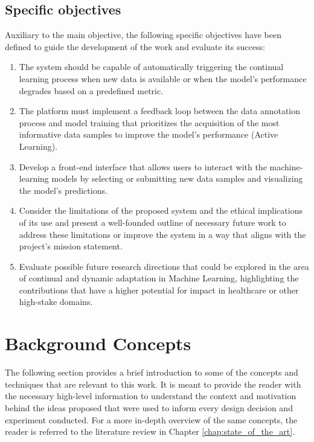 \documentclass[../main.tex]{subfiles}
\begin{document}
    \subsection*{Specific objectives} \label{sec:specific_objectives}

    Auxiliary to the main objective, the following specific objectives have been defined to guide the development of the work and evaluate its success:

    \begin{enumerate}
        \item The system should be capable of automatically triggering the continual learning process when new data is available or when the model's performance degrades based on a predefined metric.
        \item The platform must implement a feedback loop between the data annotation process and model training that prioritizes the acquisition of the most informative data samples to improve the model's performance (Active Learning).
        \item Develop a front-end interface that allows users to interact with the machine-learning models by selecting or submitting new data samples and visualizing the model's predictions.
        \item Consider the limitations of the proposed system and the ethical implications of its use and present a well-founded outline of necessary future work to address these limitations or improve the system in a way that aligns with the project's mission statement.
        \item Evaluate possible future research directions that could be explored in the area of continual and dynamic adaptation in Machine Learning, highlighting the contributions that have a higher potential for impact in healthcare or other high-stake domains.
    \end{enumerate}

    \clearpage

    \section{Background Concepts} \label{sec:background}
    
    The following section provides a brief introduction to some of the concepts and techniques that are relevant to this work. It is meant to provide the reader with the necessary high-level information to understand the context and motivation behind the ideas proposed that were used to inform every design decision and experiment conducted. For a more in-depth overview of the same concepts, the reader is referred to the literature review in Chapter \ref{chap:state_of_the_art}.
    
\end{document}
